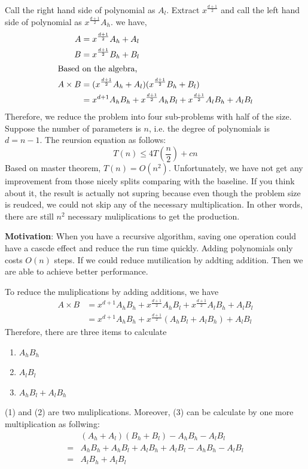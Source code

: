 \documentclass[en,hazy,blue,screen,14pt]{elegantnote}
\begin{document}
Call the right hand side of polynomial as $A_l$. Extract $x^{\frac{d+1}{2}}$ 
and call the left hand side of polynomial as $x^{\frac{d+1}{2}} A_h$. we have,
\begin{align*}
 A &= x^{\frac{d+1}{2}} A_h + A_l\\
 B &= x^{\frac{d+1}{2}} B_h + B_l\\
 \intertext{Based on the algebra,}
 A \times B &= (x^{\frac{d+1}{2}} A_h + A_l)(x^{\frac{d+1}{2}} B_h + B_l)\\
 &= x^{d+1}A_h B_h + x^{\frac{d+1}{2}}A_h B_l + x^{\frac{d+1}{2}}A_l B_h + A_l 
B_l
\end{align*}
Therefore, we reduce the problem into four sub-problems with half of the size. 
Suppose the number of parameters is $n$, i.e. the degree of polynomials is $d = 
n - 1$. The reursion equation as follows:
\[T(n) \le 4T(\frac{n}{2}) + cn\]
Based on master theorem, $T(n) = O(n^2)$. Unfortunately, we have not get any 
improvement from those nicely splits comparing with the baseline. If you think 
about it, the result is actually not supring because even though the problem 
size is reudced, we could not skip any of the necessary multiplication. In 
other words, there are still $n^2$ necessary muliplications to get the 
production.

\textbf{Motivation}: When you have a recursive algorithm, saving  one operation 
could have a cascde effect and reduce the run time quickly. Adding polynomials 
only costs $O(n)$ steps. If we could reduce mutilication by addting addition. 
Then we are able to achieve better performance. 

To reduce the muliplications by adding additions, we have
\begin{align*}
 A \times B &= x^{d+1}A_h B_h + x^{\frac{d+1}{2}}A_h B_l + x^{\frac{d+1}{2}}A_l 
B_h + A_lB_l\\
            &= x^{d+1}A_h B_h + x^{\frac{d+1}{2}}(A_h B_l + A_l B_h) + A_l 
B_l
\end{align*}
Therefore, there are three items to calculate
\begin{enumerate}[(1)]
 \item $A_h B_h$
 \item $A_l B_l$
 \item $A_h B_l + A_l B_h$
\end{enumerate}
(1) and (2) are two muliplications. Moreover, (3) can be calculate by one more 
multiplication as follwing:
\begin{align*}
 &  (A_h + A_l) (B_h + B_l) - A_h B_h - A_l B_l\\
 =& A_hB_h + A_hB_l + A_lB_h + A_lB_l - A_h B_h - A_l B_l\\
 =& A_lB_h + A_lB_l
\end{align*}
\end{document}
